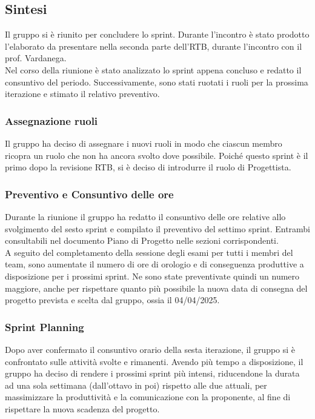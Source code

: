 \documentclass[10pt]{article}
\begin{document}
\subsection{Sintesi}
Il gruppo si è riunito per concludere lo sprint. Durante l'incontro è stato prodotto l'elaborato da presentare nella seconda parte dell'RTB, durante l'incontro con il prof. Vardanega.\\
Nel corso della riunione è stato analizzato lo sprint appena concluso e redatto il consuntivo del periodo. Successivamente, sono stati ruotati i ruoli per la prossima iterazione e stimato il relativo preventivo.

\subsubsection{Assegnazione ruoli}
Il gruppo ha deciso di assegnare i nuovi ruoli in modo che ciascun membro ricopra un ruolo che non ha ancora svolto dove possibile. Poiché questo sprint è il primo dopo la revisione RTB, si è deciso di introdurre il ruolo di Progettista.

\subsubsection{Preventivo e Consuntivo delle ore}
Durante la riunione il gruppo ha redatto il consuntivo delle ore relative allo svolgimento del sesto sprint e compilato il preventivo del settimo sprint. Entrambi consultabili nel documento Piano di Progetto nelle sezioni corrispondenti.\\
A seguito del completamento della sessione degli esami per tutti i membri del team, sono aumentate il numero di ore di orologio e di conseguenza produttive a disposizione per i prossimi sprint. Ne sono state preventivate quindi un numero maggiore, anche per rispettare quanto più possibile la nuova data di consegna del progetto prevista e scelta dal gruppo, ossia il 04/04/2025.

\subsubsection{Sprint Planning}
Dopo aver confermato il consuntivo orario della sesta iterazione, il gruppo si è confrontato sulle attività svolte e rimanenti. Avendo più tempo a disposizione, il gruppo ha deciso di rendere i prossimi sprint più intensi, riducendone la durata ad una sola settimana (dall'ottavo in poi) rispetto alle due attuali, per massimizzare la produttività e la comunicazione con la proponente, al fine di rispettare la nuova scadenza del progetto.
\end{document}
